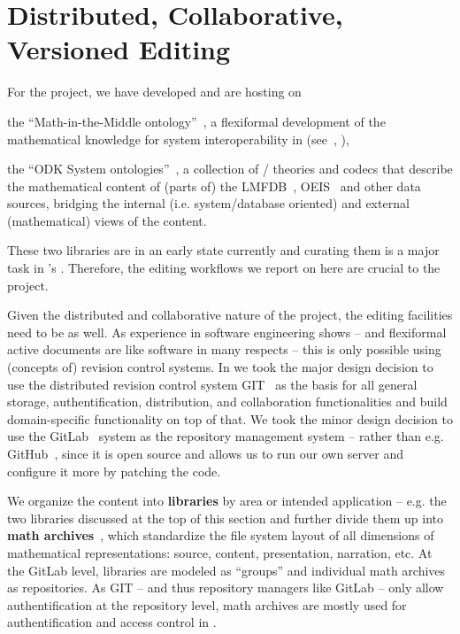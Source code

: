 \section{Distributed, Collaborative, Versioned Editing}\label{sec:editing}

For the \pn project, we have developed and are hosting on \sys
\begin{compactenum}
\item the ``Math-in-the-Middle ontology''~\cite{MitM:on}, a flexiformal
  development of the mathematical knowledge for system interoperability in \pn
  (see~\cite{DehKohKon:iop16}, ),
\item the ``ODK System ontologies''~\cite{ODKsysonto:on}, a collection of \omdoc/\mmt
  theories and codecs that describe the mathematical content of (parts of) the
  LMFDB~\cite{lmfdb:on}, OEIS~\cite{oeis} and other data sources, bridging the internal
  (i.e. system/database oriented) and external (mathematical) views of the content.
\end{compactenum}
These two \sys libraries are in an early state currently and curating them is a major task
in \pn's . Therefore, the editing workflows we
report on here are crucial to the \pn project.

Given the distributed and collaborative nature of the \pn project, the editing facilities
need to be as well. As experience in software engineering shows -- and flexiformal active
documents are like software in many respects -- this is only possible using (concepts of)
revision control systems. In \sys we took the major design decision to use the distributed
revision control system GIT~\cite{GIT:on} as the basis for all general storage,
authentification, distribution, and collaboration functionalities and build
domain-specific functionality on top of that. We took the minor design decision to use the
GitLab~\cite{GitLab:on} system as the repository management system -- rather than e.g.
GitHub~\cite{GitHub:on}, since it is open source and allows us to run our own server and
configure it more by patching the code.

We organize the content into \textbf{libraries} by area or intended application --
e.g. the two libraries discussed at the top of this section and further divide them up
into \textbf{math archives}~\cite{HorIacJuc:cscpnrr11}, which standardize the file system
layout of all dimensions of mathematical representations: source, content, presentation,
narration, etc. At the GitLab level, libraries are modeled as ``groups'' and individual
math archives as repositories. As GIT -- and thus repository managers like GitLab -- only
allow authentification at the repository level, math archives are mostly used for
authentification and access control in \sys.

